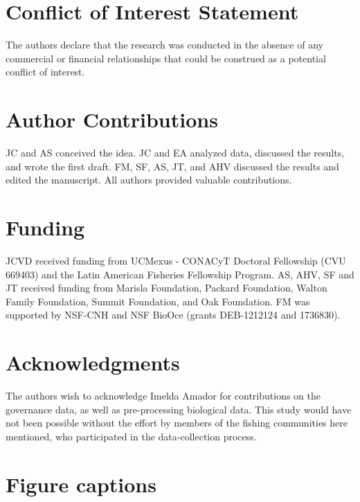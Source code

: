 \documentclass{frontiersSCNS}
\begin{document}
\section*{Conflict of Interest Statement}

The authors declare that the research was conducted in the absence of
any commercial or financial relationships that could be construed as a
potential conflict of interest.

\section*{Author Contributions}

JC and AS conceived the idea. JC and EA analyzed data, discussed the
results, and wrote the first draft. FM, SF, AS, JT, and AHV discussed
the results and edited the manuscript. All authors provided valuable
contributions.

\section*{Funding}

JCVD received funding from UCMexus - CONACyT Doctoral Fellowship (CVU
669403) and the Latin American Fisheries Fellowship Program. AS, AHV, SF
and JT received funding from Marisla Foundation, Packard Foundation,
Walton Family Foundation, Summit Foundation, and Oak Foundation. FM was
supported by NSF-CNH and NSF BioOce (grants DEB-1212124 and 1736830).

\section*{Acknowledgments}

The authors wish to acknowledge Imelda Amador for contributions on the
governance data, as well as pre-processing biological data. This study
would have not been possible without the effort by members of the
fishing communities here mentioned, who participated in the
data-collection process.

\clearpage




\clearpage

\section*{Figure captions}
\end{document}
